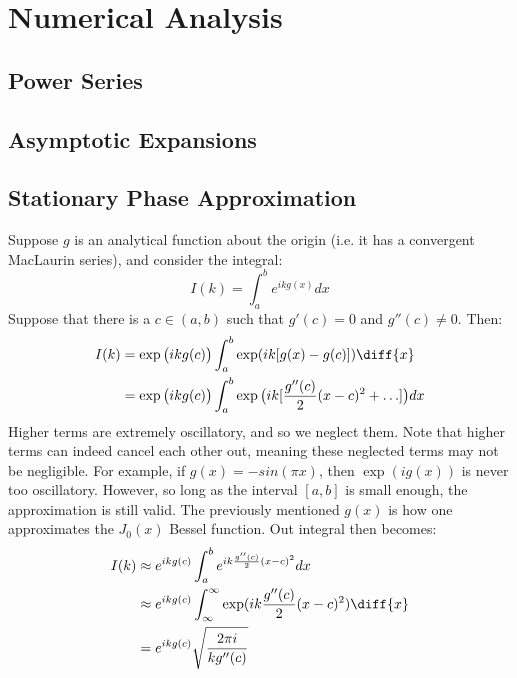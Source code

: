 \chapter{Numerical Analysis}
    \section{Power Series}
    \section{Asymptotic Expansions}
    \section{Stationary Phase Approximation}
        Suppose $g$ is an analytical function about the origin (i.e. it has a
        convergent MacLaurin series), and consider the integral:
        \begin{equation}
            I(k)=\int_{a}^{b}e^{ikg(x)}dx
        \end{equation}
        Suppose that there is a $c\in(a,b)$ such that $g'(c)=0$ and
        $g''(c)\ne0$. Then:
        \begin{align}
            I(k)&=\exp\big(ikg(c)\big)\int_{a}^{b}\exp(ik[g(x)-g(c)])\diff{x}\\
                &=\exp\big(ikg(c)\big)\int_{a}^{b}\exp\big(
                    ik[\frac{g''(c)}{2}(x-c)^{2}+\hdots]\big)dx
        \end{align}
        Higher terms are extremely oscillatory, and so we neglect them.
        Note that higher terms can indeed cancel each
        other out, meaning these neglected terms may
        not be negligible. For example, if
        $g(x)=-sin(\pi x)$, then $\exp(ig(x))$ is never
        too oscillatory. However, so long as the interval
        $[a,b]$ is small enough, the approximation is still
        valid. The previously mentioned $g(x)$ is how
        one approximates the $J_{0}(x)$ Bessel function.
        Out integral then becomes:
        \begin{align}
            I(k)&\approx e^{ikg(c)}
                    \int_{a}^{b}e^{ik\frac{g''(c)}{2}(x-c)^{2}}dx\\
                &\approx e^{ikg(c)}
                    \int_{\infty}^{\infty}
                    \exp(ik\frac{g''(c)}{2}(x-c)^{2})\diff{x}\\
                &=e^{ikg(c)}\sqrt{\frac{2\pi i}{kg''(c)}}
        \end{align}
